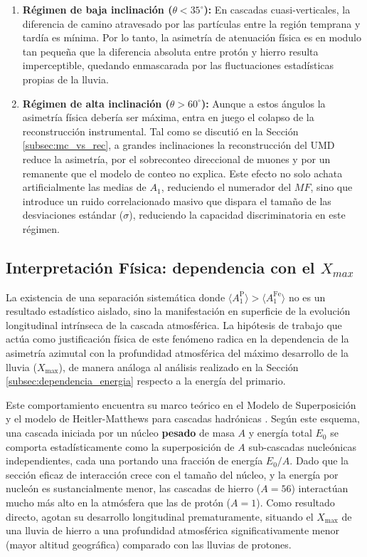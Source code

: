 \begin{enumerate}
	\item \textbf{Régimen de baja inclinación ($\theta < 35^\circ$):} En cascadas cuasi-verticales, la diferencia de camino atravesado por las partículas entre la región temprana y tardía es mínima. Por lo tanto, la asimetría de atenuación física es en modulo tan pequeña que la diferencia absoluta entre protón y hierro resulta imperceptible, quedando enmascarada por las fluctuaciones estadísticas propias de la lluvia.
	\item \textbf{Régimen de alta inclinación ($\theta > 60^\circ$):} Aunque a estos ángulos la asimetría física debería ser máxima, entra en juego el colapso de la reconstrucción instrumental. Tal como se discutió en la Sección \ref{subsec:mc_vs_rec}, a grandes inclinaciones la reconstrucción del UMD reduce la asimetría, por el sobreconteo direccional de muones y por un remanente que el modelo de conteo no explica. Este efecto no solo achata artificialmente las medias de $A_1$, reduciendo el numerador del $MF$, sino que introduce un ruido correlacionado masivo que dispara el tamaño de las desviaciones estándar ($\sigma$), reduciendo la capacidad discriminatoria en este régimen.
\end{enumerate}

\subsection{Interpretación Física: dependencia con el $X_{max}$}
\label{subsec:interpretacion_fisica}

La existencia de una separación sistemática donde $\langle A_1^{\text{P}} \rangle > \langle A_1^{\text{Fe}} \rangle$ no es un resultado estadístico aislado, sino la manifestación en superficie de la evolución longitudinal intrínseca de la cascada atmosférica. La hipótesis de trabajo que actúa como justificación física de este fenómeno radica en la dependencia de la asimetría azimutal con la profundidad atmosférica del máximo desarrollo de la lluvia ($X_{\text{max}}$), de manera análoga al análisis realizado en la Sección \ref{subsec:dependencia_energia} respecto a la energía del primario.

Este comportamiento encuentra su marco teórico en el Modelo de Superposición y el modelo de Heitler-Matthews para cascadas hadrónicas \cite{matthews2005}. Según este esquema, una cascada iniciada por un núcleo \textbf{pesado} de masa $A$ y energía total $E_0$ se comporta estadísticamente como la superposición de $A$ sub-cascadas nucleónicas independientes, cada una portando una fracción de energía $E_0/A$. Dado que la sección eficaz de interacción crece con el tamaño del núcleo, y la energía por nucleón es sustancialmente menor, las cascadas de hierro ($A=56$) interactúan mucho más alto en la atmósfera que las de protón ($A=1$). Como resultado directo, agotan su desarrollo longitudinal prematuramente, situando el $X_{\text{max}}$ de una lluvia de hierro a una profundidad atmosférica significativamente menor (mayor altitud geográfica) comparado con las lluvias de protones. 

